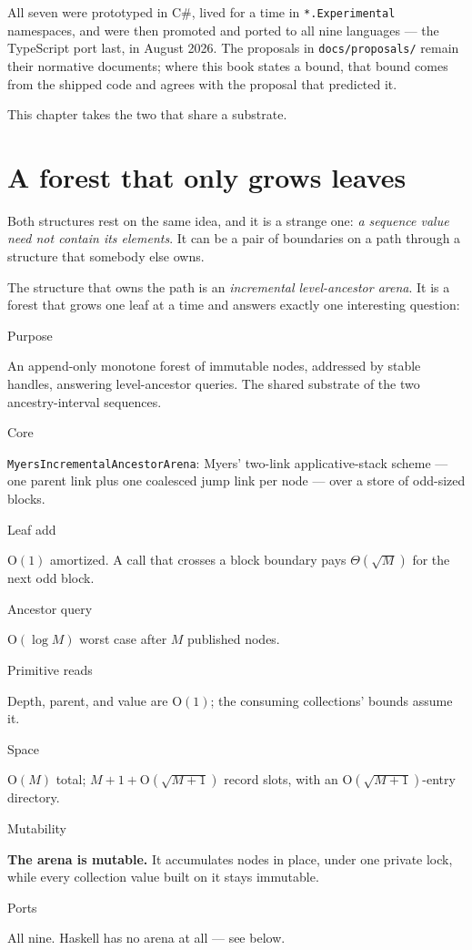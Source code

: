 \documentclass[11pt,twoside,openright]{book}
\newcommand{\code}[1]{\texorpdfstring{\textcolor{d7ink}{\texttt{#1}}}{#1}}
\newcommand{\term}[1]{\textit{#1}}
\newcommand{\bigoh}[1]{$\mathrm{O}(#1)$}
\newcommand{\spec}[2]{%
  \par\noindent
  \parbox[t]{0.21\linewidth}{\raggedright\sffamily\bfseries\footnotesize
    \color{d7slate}\strut #1}%
  \hspace{9pt}%
  \parbox[t]{\dimexpr0.79\linewidth-9pt\relax}{\raggedright\strut #2}%
  \par\vspace{3.5pt}}
\newenvironment{specimen}[1][Specimen]
  {\begin{glancebox}[#1]\small\setlength{\parindent}{0pt}}
  {\end{glancebox}}
\begin{document}
All seven were prototyped in C\#, lived for a time in \code{*.Experimental}
namespaces, and were then promoted and ported to all nine languages --- the
TypeScript port last, in August 2026. The proposals in \code{docs/proposals/}
remain their normative documents; where this book states a bound, that bound
comes from the shipped code and agrees with the proposal that predicted it.

This chapter takes the two that share a substrate.

\section{A forest that only grows leaves}

Both structures rest on the same idea, and it is a strange one: \emph{a sequence
value need not contain its elements}. It can be a pair of boundaries on a path
through a structure that somebody else owns.

The structure that owns the path is an \term{incremental level-ancestor
arena}. It is a forest that grows one leaf at a time and answers exactly
one interesting question:

\begin{center}
\end{center}

\begin{specimen}[Specimen --- the incremental ancestor arena]
%
\spec{Purpose}{An append-only monotone forest of immutable nodes, addressed by stable handles, answering level-ancestor queries. The shared substrate of the two ancestry-interval sequences.}
\spec{Core}{\code{MyersIncrementalAncestorArena}: Myers' two-link applicative-stack scheme --- one parent link plus one coalesced jump link per node --- over a store of odd-sized blocks.}
\spec{Leaf add}{\bigoh{1} amortized. A call that crosses a block boundary pays $\Theta(\sqrt{M})$ for the next odd block.}
\spec{Ancestor query}{\bigoh{\log M} worst case after $M$ published nodes.}
\spec{Primitive reads}{Depth, parent, and value are \bigoh{1}; the consuming collections' bounds assume it.}
\spec{Space}{\bigoh{M} total; $M + 1 + \mathrm{O}(\sqrt{M+1})$ record slots, with an \bigoh{\sqrt{M+1}}-entry directory.}
\spec{Mutability}{\textbf{The arena is mutable.} It accumulates nodes in place, under one private lock, while every collection value built on it stays immutable.}
\spec{Ports}{All nine. Haskell has no arena at all --- see below.}
\end{specimen}
\end{document}
